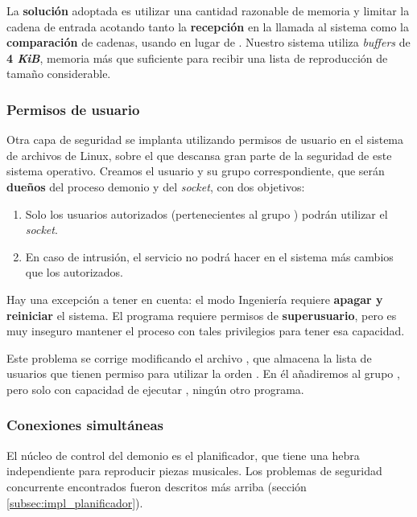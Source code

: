 La \textbf{solución} adoptada es utilizar una cantidad razonable de memoria y limitar la cadena de entrada acotando tanto la \textbf{recepción} en la llamada al sistema  como la \textbf{comparación} de cadenas, usando  en lugar de . Nuestro sistema utiliza \textit{buffers} de \textbf{4 \textit{KiB}}, memoria más que suficiente para recibir una lista de reproducción de tamaño considerable.

\subsubsection{Permisos de usuario}

Otra capa de seguridad se implanta utilizando permisos de usuario en el sistema de archivos de Linux, sobre el que descansa gran parte de la seguridad de este sistema operativo. Creamos el usuario \textbf{} y su grupo correspondiente, que serán \textbf{dueños} del proceso demonio y del \textit{socket}, con dos objetivos:

\begin{enumerate}
	\item Solo los usuarios autorizados (pertenecientes al grupo ) podrán utilizar el \textit{socket}.
	
	\item En caso de intrusión, el servicio no podrá hacer en el sistema más cambios que los autorizados.
\end{enumerate}

Hay una excepción a tener en cuenta: el modo Ingeniería requiere\textbf{ apagar y reiniciar} el sistema. El programa  requiere permisos de \textbf{superusuario}, pero es muy inseguro mantener el proceso con tales privilegios para tener esa capacidad.

Este problema se corrige modificando el archivo , que almacena la lista de usuarios que tienen permiso para utilizar la orden . En él añadiremos al grupo , pero solo con capacidad de ejecutar , ningún otro programa.

\subsubsection{Conexiones simultáneas}

El núcleo de control del demonio es el planificador, que tiene una hebra independiente para reproducir piezas musicales. Los problemas de seguridad concurrente encontrados fueron descritos más arriba (sección \ref{subsec:impl_planificador}).

